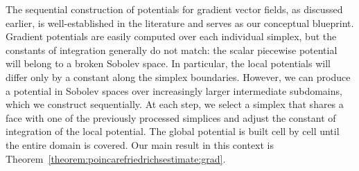 \documentclass[10pt,a4paper]{article}
\begin{document}


The sequential construction of potentials for gradient vector fields, as discussed earlier, is well-established in the literature and serves as our conceptual blueprint. 
Gradient potentials are easily computed over each individual simplex, but the constants of integration generally do not match: 
the scalar piecewise potential will belong to a broken Sobolev space. 
In particular, the local potentials will differ only by a constant along the simplex boundaries. 
However, we can produce a potential in Sobolev spaces over increasingly larger intermediate subdomains, which we construct sequentially. 
At each step, we select a simplex that shares a face with one of the previously processed simplices and adjust the constant of integration of the local potential. 
The global potential is built cell by cell until the entire domain is covered. 
Our main result in this context is Theorem~\ref{theorem:poincarefriedrichsestimate:grad}.



\end{document}
